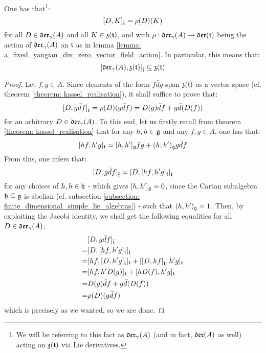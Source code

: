         \begin{lemma} \label{lemma: derivation_action_on_toroidal_centres}
            One has that\footnote{We will be referring to this fact as $\mathfrak{der}_{\gamma}(A)$ (and in fact, $\mathfrak{der}(A)$ as well) acting on $\mathfrak{z}(\mathfrak{t})$ via Lie derivatives.}:
                $$[D, K]_{\hat{\mathfrak{t}}} = \rho(D)(K)$$
            for all $D \in \mathfrak{der}_{\gamma}(A)$ and all $K \in \mathfrak{z}(\mathfrak{t})$, and with $\rho: \mathfrak{der}_{\gamma}(A) \to \mathfrak{der}(\mathfrak{t})$ being the action of $\mathfrak{der}_{\gamma}(A)$ on $\mathfrak{t}$ as in lemma \ref{lemma: a_fixed_yangian_div_zero_vector_field_action}. In particular, this means that:
                $$[\mathfrak{der}_{\gamma}(A), \mathfrak{z}(\mathfrak{t})]_{\hat{\mathfrak{t}}} \subseteq \mathfrak{z}(\mathfrak{t})$$
        \end{lemma}
            \begin{proof}
                Let $f, g \in A$. Since elements of the form $f \bar{d}g$ span $\mathfrak{z}(\mathfrak{t})$ as a vector space (cf. theorem \ref{theorem: kassel_realisation}), it shall suffice to prove that:
                    $$[D, g \bar{d}f]_{\hat{\mathfrak{t}}} = \rho(D)( g\bar{d}f ) = D(g) \bar{d}f + g \bar{d}(D(f))$$
                for an arbitrary $D \in \mathfrak{der}_{\gamma}(A)$. To this end, let us firstly recall from theorem \ref{theorem: kassel_realisation} that for any $h, h \in \mathfrak{g}$ and any $f, g \in A$, one has that:
                    $$[h f, h' g]_{\mathfrak{t}} = [h, h']_{\mathfrak{g}} fg + (h, h')_{\mathfrak{g}} g \bar{d}f$$
                From this, one infers that:
                    $$[D, g \bar{d}f]_{\hat{\mathfrak{t}}} = [ D, [hf, h' g]_{\mathfrak{t}} ]_{\hat{\mathfrak{t}}}$$
                for any choices of $h, h \in \mathfrak{h}$ - which gives $[h, h']_{\mathfrak{g}} = 0$, since the Cartan subalgebra $\mathfrak{h} \subseteq \mathfrak{g}$ is abelian (cf. subsection \ref{subsection: finite_dimensional_simple_lie_algebras}) - such that $(h, h')_{\mathfrak{g}} = 1$. Then, by exploiting the Jacobi identity, we shall get the following equalities for all $D \in \mathfrak{der}_{\gamma}(A)$:
                    $$
                        \begin{aligned}
                            & [D, g \bar{d}f]_{\hat{\mathfrak{t}}}
                            \\
                            = & [ D, [h f, h' g]_{\mathfrak{t}} ]_{\hat{\mathfrak{t}}}
                            \\
                            = & [ h f, [D, h' g]_{\hat{\mathfrak{t}}} ]_{\mathfrak{t}} + [ [D, h f]_{\hat{\mathfrak{t}}}, h' g ]_{\mathfrak{t}}
                            \\
                            = & [ h f, h' D( g ) ]_{\mathfrak{t}} + [ h D( f ), h' g ]_{\mathfrak{t}}
                            \\
                            = & D(g) \bar{d}f + g \bar{d}(D(f))
                            \\
                            = & \rho(D)( g \bar{d}f )
                        \end{aligned}
                    $$
                which is precisely as we wanted, so we are done. 
            \end{proof}
